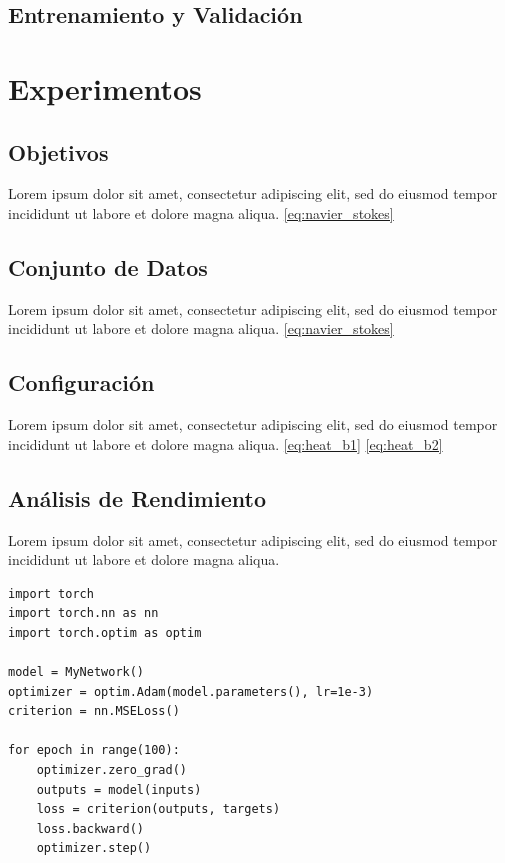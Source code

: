 \documentclass[12pt]{extarticle}
\numberwithin{equation}{section}
\begin{document}
\subsection{Entrenamiento y Validación}

\section{Experimentos}
\subsection{Objetivos}
Lorem ipsum dolor sit amet, consectetur adipiscing elit, sed do eiusmod tempor incididunt ut labore et dolore magna aliqua. \autoref{eq:navier_stokes} %

\subsection{Conjunto de Datos}
Lorem ipsum dolor sit amet, consectetur adipiscing elit, sed do eiusmod tempor incididunt ut labore et dolore magna aliqua. \eqref{eq:navier_stokes} %

\subsection{Configuración}
Lorem ipsum dolor sit amet, consectetur adipiscing elit, sed do eiusmod tempor incididunt ut labore et dolore magna aliqua. \eqref{eq:heat_b1} \eqref{eq:heat_b2}

\subsection{Análisis de Rendimiento}
Lorem ipsum dolor sit amet, consectetur adipiscing elit, sed do eiusmod tempor incididunt ut labore et dolore magna aliqua. \\

\begin{lstlisting}[caption={Entrenamiento de la red con Adam}, label={code:adam}]
import torch
import torch.nn as nn
import torch.optim as optim

model = MyNetwork()
optimizer = optim.Adam(model.parameters(), lr=1e-3)
criterion = nn.MSELoss()

for epoch in range(100):
    optimizer.zero_grad()
    outputs = model(inputs)
    loss = criterion(outputs, targets)
    loss.backward()
    optimizer.step()

\end{lstlisting}
\end{document}
